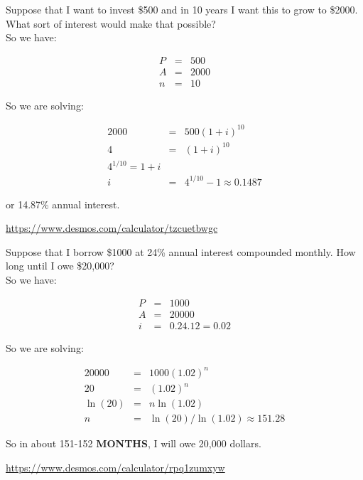 \begin{example}
Suppose that I want to invest \$500 and in 10 years I want this to grow to \$2000.  What sort of interest would make that possible?\\

So we have:

\begin{eqnarray*}
P&=&500\\
A&=&2000\\
n&=&10
\end{eqnarray*}

So we are solving:

\begin{eqnarray*}
2000&=&500(1+i)^{10}\\
4&=&(1+i)^{10}\\
4^{1/10}=1+i\\
i&=&4^{1/10}-1\approx0.1487
\end{eqnarray*}

or 14.87\% annual interest.

\url{https://www.desmos.com/calculator/tzcuetbwgc}

\end{example}

\begin{example}
Suppose that I borrow \$1000 at 24\% annual interest compounded monthly.  How long until I owe \$20,000?\\

So we have:

\begin{eqnarray*}
P&=&1000\\
A&=&20000\\
i&=&0.24.12=0.02
\end{eqnarray*}

So we are solving:

\begin{eqnarray*}
20000&=&1000(1.02)^n\\
20&=&(1.02)^n\\
\ln(20)&=&n\ln(1.02)\\
n&=&\ln(20)/\ln(1.02)\approx151.28
\end{eqnarray*}

So in about 151-152 \textbf{ MONTHS}, I will owe 20,000 dollars.

\url{https://www.desmos.com/calculator/rpq1zumxyw}



\end{example}

